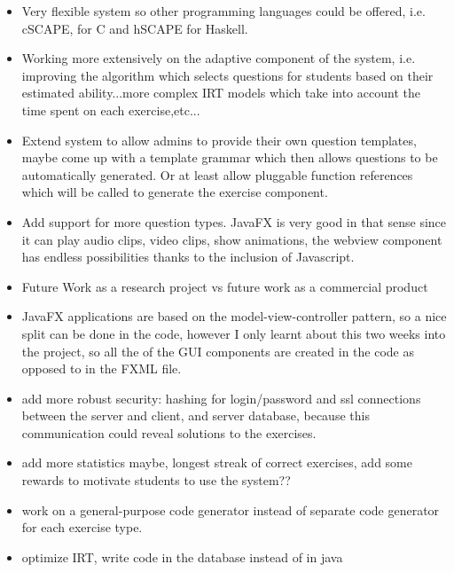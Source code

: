 \begin{itemize}
\item Very flexible system so other programming languages could be offered, i.e. cSCAPE, for C and hSCAPE for Haskell. 
\item Working more extensively on the adaptive component of the system, i.e. improving the algorithm which selects questions for students based on their estimated ability...more complex IRT models which take into account the time spent on each exercise,etc...
\item Extend system to allow admins to provide their own question templates, maybe come up with a template grammar which then allows questions to be automatically generated. Or at least allow pluggable function references which will be called to generate the exercise component.
\item Add support for more question types. JavaFX is very good in that sense since it can play audio clips, video clips, show animations, the webview component has endless possibilities thanks to the inclusion of Javascript.
\item Future Work as a research project vs future work as a commercial product
\item JavaFX applications are based on the model-view-controller pattern, so a nice split can be done in the code, however I only learnt about this two weeks into the project, so all the of the GUI components are created in the code as opposed to in the FXML file.
\item add more robust security: hashing for login/password and ssl connections between the server and client, and server database, because this communication could reveal solutions to the exercises.
\item add more statistics maybe, longest streak of correct exercises, add some rewards to motivate students to use the system??
\item work on a general-purpose code generator instead of separate code generator for each exercise type.
\item optimize IRT, write code in the database instead of in java
\end{itemize}